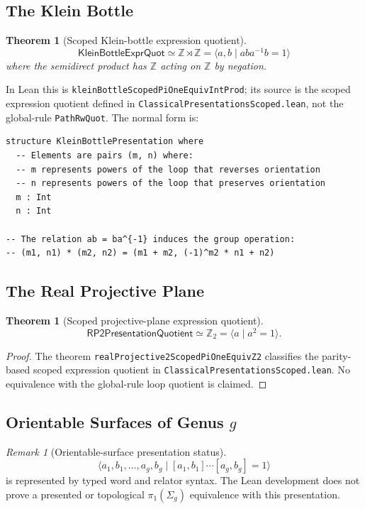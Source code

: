 \documentclass{lmcs}
\theoremstyle{definition}
\theoremstyle{plain}
\newtheorem{theorem}[definition]{Theorem}
\theoremstyle{remark}
\newtheorem{remark}[definition]{Remark}
\newcommand{\piOne}{\pi_1}
\newcommand{\ZZ}{\mathbb{Z}}
\begin{document}
\subsection{The Klein Bottle}

\begin{theorem}[Scoped Klein-bottle expression quotient]
\[
\mathsf{KleinBottleExprQuot}
\simeq \ZZ \rtimes \ZZ
= \langle a, b \mid aba^{-1}b = 1 \rangle
\]
where the semidirect product has $\ZZ$ acting on $\ZZ$ by negation.
\end{theorem}

In Lean this is \texttt{kleinBottleScopedPiOneEquivIntProd}; its source is the
scoped expression quotient defined in
\texttt{ClassicalPresentationsScoped.lean}, not the global-rule
\texttt{PathRwQuot}.  The normal form is:
\begin{lstlisting}
structure KleinBottlePresentation where
  -- Elements are pairs (m, n) where:
  -- m represents powers of the loop that reverses orientation
  -- n represents powers of the loop that preserves orientation
  m : Int
  n : Int

-- The relation ab = ba^{-1} induces the group operation:
-- (m1, n1) * (m2, n2) = (m1 + m2, (-1)^m2 * n1 + n2)
\end{lstlisting}

\subsection{The Real Projective Plane}

\begin{theorem}[Scoped projective-plane expression quotient]
\[
\mathsf{RP2PresentationQuotient}
\simeq \ZZ_2 = \langle a \mid a^2 = 1 \rangle.
\]
\end{theorem}

\begin{proof}
The theorem \texttt{realProjective2ScopedPiOneEquivZ2} classifies the
parity-based scoped expression quotient in
\texttt{ClassicalPresentationsScoped.lean}.  No equivalence with the
global-rule loop quotient is claimed.
\end{proof}

\subsection{Orientable Surfaces of Genus \texorpdfstring{$g$}{g}}

\begin{remark}[Orientable-surface presentation status]
\[
\langle a_1, b_1, \ldots, a_g, b_g
\mid [a_1,b_1]\cdots[a_g,b_g]=1\rangle
\]
is represented by typed word and relator syntax.  The Lean development does
not prove a presented or topological
\(\piOne(\Sigma_g)\) equivalence with this presentation.
\end{remark}
\end{document}
